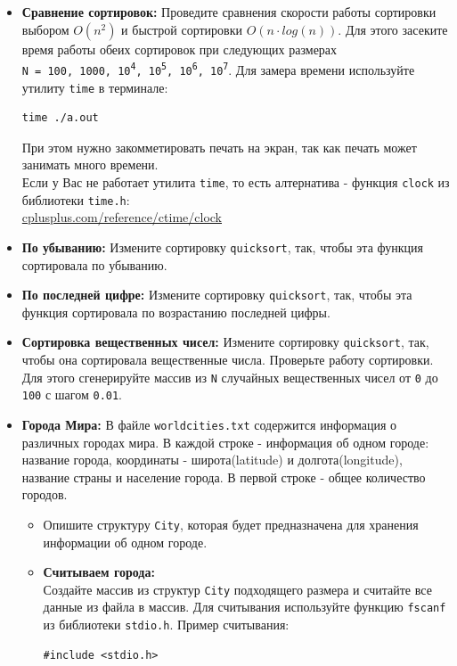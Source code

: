 \documentclass{article}
\begin{document}
\begin{itemize}
\item \textbf{Сравнение сортировок:} Проведите сравнения скорости работы сортировки выбором $O(n^2)$ и быстрой сортировки $O(n \cdot log(n))$. Для этого засеките время работы обеих сортировок при следующих размерах \\
\texttt{N = 100, 1000, 10\textsuperscript{4}, 10\textsuperscript{5}, 10\textsuperscript{6}, 10\textsuperscript{7}}.
Для замера времени используйте утилиту \texttt{time} в терминале:
\begin{verbatim}
time ./a.out
\end{verbatim}
При этом нужно закомметировать печать на экран, так как печать может занимать много времени.\\
Если у Вас не работает утилита \texttt{time}, то есть алтернатива - функция \texttt{clock} из библиотеки \texttt{time.h}:   \\
\href{http://www.cplusplus.com/reference/ctime/clock/}{cplusplus.com/reference/ctime/clock}
\item \textbf{По убыванию:} Измените сортировку \texttt{quicksort}, так, чтобы эта функция сортировала по убыванию.
\item \textbf{По последней цифре:} Измените сортировку \texttt{quicksort}, так, чтобы эта функция сортировала по возрастанию последней цифры.
\item \textbf{Сортировка вещественных чисел:} Измените сортировку \texttt{quicksort}, так, чтобы она сортировала вещественные числа. Проверьте работу сортировки. Для этого сгенерируйте массив из \texttt{N} случайных вещественных чисел от \texttt{0} до \texttt{100} с шагом \texttt{0.01}.
\item \textbf{Города Мира:} В файле \texttt{worldcities.txt} содержится информация о различных городах мира. В каждой строке - информация об одном городе: название города, координаты -  широта(latitude) и долгота(longitude), название страны и население города. В первой строке - общее количество городов.
\begin{itemize}
\item Опишите структуру \texttt{City}, которая будет предназначена для хранения информации об одном городе.
\item \textbf{Считываем города:}\\ Создайте массив из структур \texttt{City} подходящего размера и считайте все данные из файла в массив. Для считывания используйте функцию \texttt{fscanf} из библиотеки \texttt{stdio.h}. Пример считывания:
\begin{lstlisting}
#include <stdio.h>


\end{lstlisting}
\end{itemize}
\end{itemize}
\end{document}

